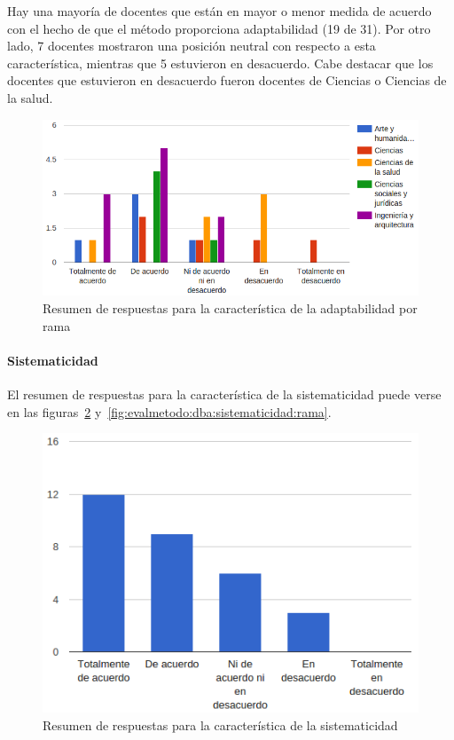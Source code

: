 Hay una mayoría de docentes que están en mayor o menor medida de acuerdo con el hecho de que el método proporciona adaptabilidad (19 de 31). Por otro lado, 7 docentes mostraron una posición neutral con respecto a esta característica, mientras que 5 estuvieron en desacuerdo. Cabe destacar que los docentes que estuvieron en desacuerdo fueron docentes de Ciencias o Ciencias de la salud.

\begin{figure}[h]
  \begin{center}
    \includegraphics[scale=0.45]{C_DBA_adaptabilidad_rama.png}
  \end{center}
  \caption{Resumen de respuestas para la característica de la adaptabilidad por rama}
  \label{fig:evalmetodo:dba:adaptabilidad:rama}
\end{figure}

\newpage
\paragraph*{Sistematicidad}

El resumen de respuestas para la característica de la sistematicidad puede verse en las figuras~\ref{fig:evalmetodo:dba:sistematicidad} y~\ref{fig:evalmetodo:dba:sistematicidad:rama}.

\begin{figure}[h]
  \begin{center}
    \includegraphics[scale=0.40]{C_DBA_sistematicidad.png}
  \end{center}
  \caption{Resumen de respuestas para la característica de la sistematicidad}
  \label{fig:evalmetodo:dba:sistematicidad}
\end{figure}

